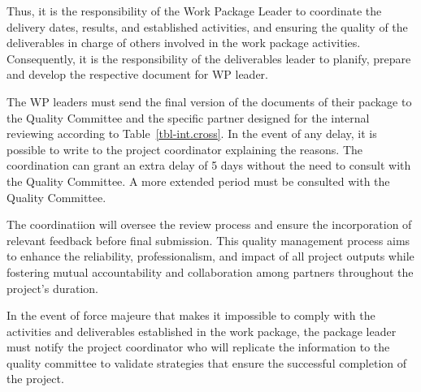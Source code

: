 \documentclass[
  12pt,
  oneside]{book}
\begin{document}
Thus, it is the responsibility of the Work Package Leader to coordinate
the delivery dates, results, and established activities, and ensuring
the quality of the deliverables in charge of others involved in the work
package activities. Consequently, it is the responsibility of the
deliverables leader to planify, prepare and develop the respective
document for WP leader.

The WP leaders must send the final version of the documents of their
package to the Quality Committee and the specific partner designed for
the internal reviewing according to Table~\ref{tbl-int.cross}. In the
event of any delay, it is possible to write to the project coordinator
explaining the reasons. The coordination can grant an extra delay of 5
days without the need to consult with the Quality Committee. A more
extended period must be consulted with the Quality Committee.

The coordinatiion will oversee the review process and ensure the
incorporation of relevant feedback before final submission. This quality
management process aims to enhance the reliability, professionalism, and
impact of all project outputs while fostering mutual accountability and
collaboration among partners throughout the project's duration.

In the event of force majeure that makes it impossible to comply with
the activities and deliverables established in the work package, the
package leader must notify the project coordinator who will replicate
the information to the quality committee to validate strategies that
ensure the successful completion of the project.

\begingroup\fontsize{11}{13}\selectfont
\end{document}
